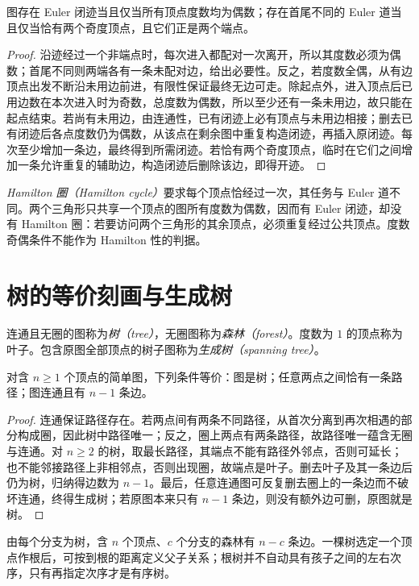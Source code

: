 \begin{theorem}
图存在 Euler 闭迹当且仅当所有顶点度数均为偶数；存在首尾不同的 Euler 道当且仅当恰有两个奇度顶点，且它们正是两个端点。
\end{theorem}
\begin{proof}
沿迹经过一个非端点时，每次进入都配对一次离开，所以其度数必须为偶数；首尾不同则两端各有一条未配对边，给出必要性。反之，若度数全偶，从有边顶点出发不断沿未用边前进，有限性保证最终无边可走。除起点外，进入顶点后已用边数在本次进入时为奇数，总度数为偶数，所以至少还有一条未用边，故只能在起点结束。若尚有未用边，由连通性，已有闭迹上必有顶点与未用边相接；删去已有闭迹后各点度数仍为偶数，从该点在剩余图中重复构造闭迹，再插入原闭迹。每次至少增加一条边，最终得到所需闭迹。若恰有两个奇度顶点，临时在它们之间增加一条允许重复的辅助边，构造闭迹后删除该边，即得开迹。
\end{proof}

\emph{Hamilton 圈（Hamilton cycle）}要求每个顶点恰经过一次，其任务与 Euler 道不同。两个三角形只共享一个顶点的图所有度数为偶数，因而有 Euler 闭迹，却没有 Hamilton 圈：若要访问两个三角形的其余顶点，必须重复经过公共顶点。度数奇偶条件不能作为 Hamilton 性的判据。

\section{树的等价刻画与生成树}

\begin{definition}
连通且无圈的图称为\emph{树（tree）}，无圈图称为\emph{森林（forest）}。度数为 $1$ 的顶点称为叶子。包含原图全部顶点的树子图称为\emph{生成树（spanning tree）}。
\end{definition}

\begin{theorem}
对含 $n\ge1$ 个顶点的简单图，下列条件等价：图是树；任意两点之间恰有一条路径；图连通且有 $n-1$ 条边。
\end{theorem}
\begin{proof}
连通保证路径存在。若两点间有两条不同路径，从首次分离到再次相遇的部分构成圈，因此树中路径唯一；反之，圈上两点有两条路径，故路径唯一蕴含无圈与连通。对 $n\ge2$ 的树，取最长路径，其端点不能有路径外邻点，否则可延长；也不能邻接路径上非相邻点，否则出现圈，故端点是叶子。删去叶子及其一条边后仍为树，归纳得边数为 $n-1$。最后，任意连通图可反复删去圈上的一条边而不破坏连通，终得生成树；若原图本来只有 $n-1$ 条边，则没有额外边可删，原图就是树。
\end{proof}

由每个分支为树，含 $n$ 个顶点、$c$ 个分支的森林有 $n-c$ 条边。一棵树选定一个顶点作根后，可按到根的距离定义父子关系；根树并不自动具有孩子之间的左右次序，只有再指定次序才是有序树。


